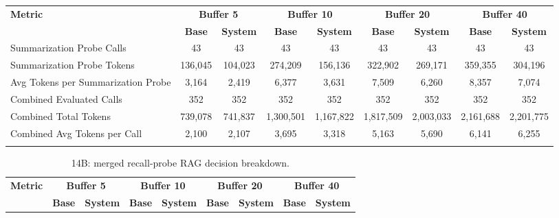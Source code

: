 \begin{landscape}
\begin{longtable}{@{}p{3.8cm}cccccccc@{}}
\toprule
\textbf{Metric} & \multicolumn{2}{c}{\textbf{Buffer 5}} & \multicolumn{2}{c}{\textbf{Buffer 10}} & \multicolumn{2}{c}{\textbf{Buffer 20}} & \multicolumn{2}{c}{\textbf{Buffer 40}} \\
\cmidrule(lr){2-3}\cmidrule(lr){4-5}\cmidrule(lr){6-7}\cmidrule(lr){8-9}
 & \textbf{Base} & \textbf{System} & \textbf{Base} & \textbf{System} & \textbf{Base} & \textbf{System} & \textbf{Base} & \textbf{System} \\
\midrule
\endhead
Summarization Probe Calls & 43 & 43 & 43 & 43 & 43 & 43 & 43 & 43 \\
Summarization Probe Tokens & 136,045 & 104,023 & 274,209 & 156,136 & 322,902 & 269,171 & 359,355 & 304,196 \\
Avg Tokens per Summarization Probe & 3,164 & 2,419 & 6,377 & 3,631 & 7,509 & 6,260 & 8,357 & 7,074 \\
Combined Evaluated Calls & 352 & 352 & 352 & 352 & 352 & 352 & 352 & 352 \\
Combined Total Tokens & 739,078 & 741,837 & 1,300,501 & 1,167,822 & 1,817,509 & 2,003,033 & 2,161,688 & 2,201,775 \\
Combined Avg Tokens per Call & 2,100 & 2,107 & 3,695 & 3,318 & 5,163 & 5,690 & 6,141 & 6,255 \\
\botrule
\end{longtable}
\begin{longtable}{@{}p{3.8cm}cccccccc@{}}
\caption{14B: merged recall-probe RAG decision breakdown.}\label{tab:app_14b_rag_probe}\\

\toprule
\textbf{Metric} & \multicolumn{2}{c}{\textbf{Buffer 5}} & \multicolumn{2}{c}{\textbf{Buffer 10}} & \multicolumn{2}{c}{\textbf{Buffer 20}} & \multicolumn{2}{c}{\textbf{Buffer 40}} \\
\cmidrule(lr){2-3}\cmidrule(lr){4-5}\cmidrule(lr){6-7}\cmidrule(lr){8-9}
 & \textbf{Base} & \textbf{System} & \textbf{Base} & \textbf{System} & \textbf{Base} & \textbf{System} & \textbf{Base} & \textbf{System} \\
\midrule
\endfirsthead


\end{longtable}
\end{landscape}
